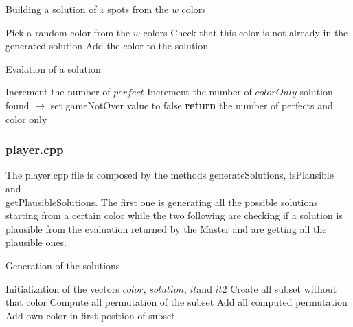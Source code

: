 \documentclass{article}
\begin{document}
\begin{algorithm}[H] 
  \caption{Building a solution of $z$ spots from the $w$ colors} \label{alg:build-sol}
  \begin{algorithmic}[1]
  \State Pick a random color from the $w$ colors
  \State Check that this color is not already in the generated solution
  \State Add the color to the solution
  \EndFor
  \EndProcedure
  \end{algorithmic}
\end{algorithm}

\begin{algorithm}[H] 
  \caption{Evalation of a solution} \label{alg:evaluate}
  \begin{algorithmic}[1]
    \State Increment the number of $perfect$ 
    \State Increment the number of $colorOnly$
    \EndIf
  \EndFor
  \State solution found $\rightarrow$ set gameNotOver value to false
  \EndIf
  \State \textbf{return} the number of perfects and color only 
  \EndProcedure
  \end{algorithmic}
\end{algorithm}

\subsubsection{{\selectfont player.cpp}}

The {\selectfont player.cpp} file is composed by the methods {\selectfont generateSolutions}, {\selectfont isPlausible} and \\ {\selectfont getPlausibleSolutions}. The first one is generating all the possible solutions starting from a certain color while the two following are checking if a solution is plausible from the evaluation returned by the Master and are getting all the plausible ones.    

\begin{algorithm}[H] 
  \caption{Generation of the solutions} 
  \begin{algorithmic}[1]
  \State Initialization of the vectors $color$, $solution$, $it$and $it2$  
  \State Create all subset without that color
  \State Compute all permutation of the subset
  \State Add all computed permutation
  \EndFor
  \State  Add own color in first position of subset
  \EndFor
  \EndFor
  \EndProcedure
  \end{algorithmic}
\end{algorithm}
\end{document}
